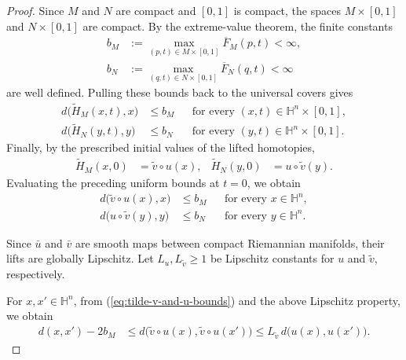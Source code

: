 \documentclass[11pt]{amsart}
\theoremstyle{plain}
\theoremstyle{plain}
\theoremstyle{plain}
\numberwithin{equation}{section}
\begin{document}
\begin{proof}
Since \(M\) and \(N\) are compact and \([0,1]\) is compact, the
spaces \(M\times[0,1]\) and \(N\times[0,1]\) are compact.  By the
extreme-value theorem, the finite constants
\begin{align}
b_M&:=\max_{(p,t)\in M\times[0,1]}\overline F_M(p,t)<\infty,
\nonumber\\
b_N&:=\max_{(q,t)\in N\times[0,1]}\overline F_N(q,t)<\infty
\nonumber
\end{align}
are well defined.  Pulling these bounds back to the universal
covers gives
\begin{align}
d\bigl(\widetilde H_M(x,t),x\bigr)&\leq b_M
&&\text{for every }(x,t)\in\mathbb H^n\times[0,1],
\nonumber\\
d\bigl(\widetilde H_N(y,t),y\bigr)&\leq b_N
&&\text{for every }(y,t)\in\mathbb H^n\times[0,1].
\nonumber
\end{align}
Finally, by the prescribed initial values of the lifted homotopies,
\begin{align}
\widetilde H_M(x,0)&=\widetilde v\circ u(x),
&
\widetilde H_N(y,0)&=u\circ\widetilde v(y).
\nonumber
\end{align}
Evaluating the preceding uniform bounds at \(t=0\), we obtain
\begin{align}
d\bigl(\widetilde v\circ u(x),x\bigr)&\leq b_M
&&\text{for every }x\in\mathbb H^n,
\label{eq:tilde-v-and-u-bounds}\\
d\bigl(u\circ\widetilde v(y),y\bigr)&\leq b_N
&&\text{for every }y\in\mathbb H^n.
\label{eq:lifted-homotopy-bounds}
\end{align}



Since \(\bar u\) and \(\bar v\) are smooth maps between compact Riemannian manifolds, their lifts are globally Lipschitz.  Let \(L_u,L_{\widetilde v}\geq1\) be Lipschitz constants for \(u\) and \(\widetilde v\), respectively. 

For \(x,x'\in\mathbb H^n\), from (\ref{eq:tilde-v-and-u-bounds}) and the above Lipschitz property, we obtain
\begin{align}
d(x,x')-2b_M
&\leq
d\bigl(\widetilde v\circ u(x),
       \widetilde v\circ u(x')\bigr)
\leq
L_{\widetilde v}\,d\bigl(u(x),u(x')\bigr).
\nonumber
\end{align}


\end{proof}
\end{document}
